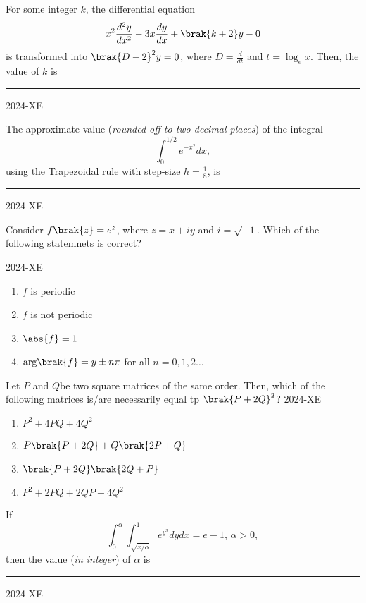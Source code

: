 \item For some integer $k$, the differential equation 
		$$ x^2 \frac{d^2 y}{dx^2} -3x\frac{dy}{dx}+\brak{k+2}y-0$$
	is transformed into $\brak{D-2}^2 y=0$, where $D=\frac{d}{dt}$ and $t=\log _e x$. Then, the value of $k$ is \rule{1cm}{0.2pt}

 \hfill{2024-XE}


\item The approximate value (\textit{rounded off to two decimal places}) of the integral 
	$$ \int ^{1/2} _{0} e^{-x^2} dx,$$
	using the Trapezoidal rule with step-size $h=\frac{1}{8}$, is \rule{1cm}{0.2pt}
\hfill{2024-XE}





	\item Consider $f\brak{z}=e^z$, where $z=x+iy$ and $i=\sqrt{-1}$. Which of the following statemnets is correct?

	 \hfill{2024-XE}

		\begin{enumerate}
			\item $f$ is periodic
			\item $f$ is not periodic
			\item $\abs{f}=1$
			\item $\text{arg}\brak{f}=y \pm n \pi$ for all $n=0,1,2 \ldots$
		\end{enumerate}

	\item Let $P$ and $Q$be two square matrices of the same order. Then, which of the following matrices is/are necessarily equal tp $\brak{P+2Q}^2$?
	\hfill{2024-XE}

		\begin{enumerate}
			\item $P^2 +4PQ +4Q^2$
			\item $P\brak{P+2Q}+Q\brak{2P+Q}$
			\item $\brak{P+2Q} \brak{2Q+P}$
			\item $P^2 +2PQ+2QP+4Q^2$
		\end{enumerate}

	\item If 
		$$ \int _0 ^{\alpha} \int_{\sqrt{x/{\alpha}}} ^1 e^{y^3}dydx=e-1, \, \alpha>0,$$
		then the value (\textit{in integer}) of $\alpha$ is \rule{1cm}{0.2pt}
	\hfill{2024-XE}

